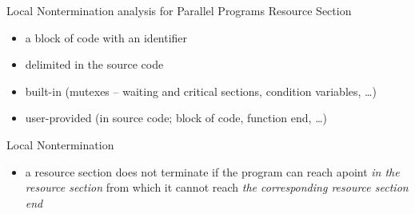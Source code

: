 \documentclass[aspectratio=169, fi]{paradise-slide}
\begin{document}
\begin{frame}[fragile]{Local Nontermination analysis for Parallel Programs}
    Resource Section
    \begin{itemize}
      \item a block of code with an identifier
      \item delimited in the source code
      \item built-in (mutexes – waiting and critical sections, condition variables, …)
      \item user-provided (in source code; block of code, function end, …)
    \end{itemize}
    \pause

    \bigskip
    Local Nontermination
    \begin{itemize}
      \item a resource section does not terminate if the program can reach apoint \emph{in the
        resource section} from which it cannot reach \emph{the corresponding resource section end}
    \end{itemize}
    \pause


\end{frame}
\end{document}
